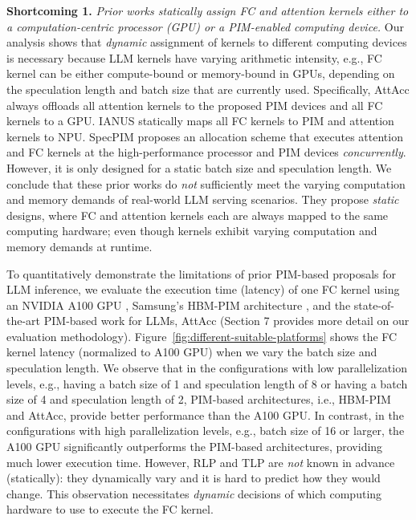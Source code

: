 \noindent\textbf{Shortcoming 1.} \textit{Prior works statically assign FC and attention kernels either to a computation-centric processor (GPU) or a PIM-enabled computing device.} Our analysis shows that \emph{dynamic} assignment of kernels to different computing devices is necessary because LLM kernels have varying arithmetic intensity, e.g., FC kernel can be either compute-bound or memory-bound in GPUs, depending on the speculation length and batch size that are currently used. Specifically, AttAcc \cite{park2024attacc} always offloads all attention kernels to the proposed PIM devices and all FC kernels to a GPU. 
IANUS \cite{seo2024ianus} statically maps all FC kernels to PIM and attention kernels to NPU.
SpecPIM \cite{li2024specpim} proposes an allocation scheme that executes attention and FC kernels at the high-performance processor and PIM devices \textit{concurrently}. However, it is only designed for a static batch size and speculation length.
We conclude that these prior works do \emph{not} sufficiently meet the varying computation and memory demands of real-world LLM serving scenarios. They propose \emph{static} designs, where FC and attention kernels each are always mapped to the same computing hardware; even though kernels exhibit varying computation and memory demands at runtime.



To quantitatively demonstrate the limitations of prior PIM-based proposals for LLM inference, we evaluate the execution time (latency) of one FC kernel using an NVIDIA A100 GPU \cite{choquette2020nvidia}, Samsung's HBM-PIM architecture \cite{lee2021hardware}, and the state-of-the-art PIM-based work for LLMs, AttAcc \cite{park2024attacc} (Section 7 provides more detail on our evaluation methodology). 
Figure~\ref{fig:different-suitable-platforms} shows the FC kernel latency (normalized to A100 GPU) when we vary the batch size and speculation length.
We observe that in the configurations with low parallelization levels, e.g., having a batch size of 1 and speculation length of 8 or having a batch size of 4 and speculation length of 2, PIM-based architectures, i.e., HBM-PIM and AttAcc, provide better performance than the A100 GPU. In contrast, in the configurations with high parallelization levels, e.g., batch size of 16 or larger, the A100 GPU significantly outperforms the PIM-based architectures, providing much lower execution time.
However, RLP and TLP are \emph{not} known in advance (statically): they dynamically vary and it is hard to predict how they would change. This observation necessitates \emph{dynamic} decisions of which computing hardware to use to execute the FC kernel.

